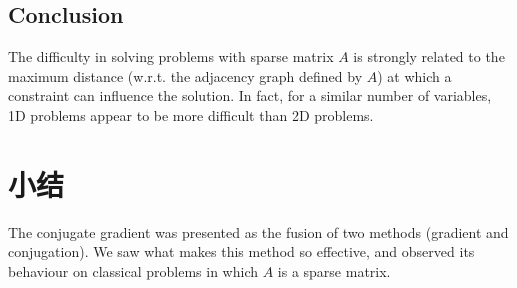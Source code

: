 \documentclass[notitlepage,oneside]{book}
\begin{document}
\subsection{Conclusion}

The difficulty in solving problems with sparse matrix $A$ is strongly related to the maximum distance (w.r.t. the adjacency graph defined by $A$) at which a constraint can influence the solution.
In fact, for a similar number of variables, 1D problems appear to be more difficult than 2D problems.

\section{小结}
The conjugate gradient was presented as the fusion of two methods (gradient and conjugation). 
We saw what makes this method so effective, and observed its behaviour on classical problems in which $A$ is a sparse matrix. 

\vspace{6mm}
\end{document}
